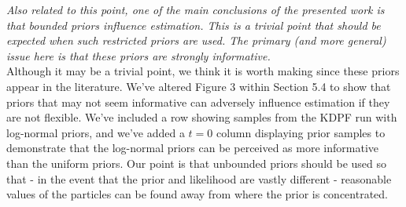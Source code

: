 \documentclass{article}
\newcommand{\danny}[1]{{\color{blue} DANNY: #1}}
\begin{document}



\noindent \emph{Also related to this point, one of the main conclusions of the presented work is that bounded priors influence estimation. This is a trivial point that should be expected when such restricted priors are used. The primary (and more general) issue here is that these priors are strongly informative.} \\

Although it may be a trivial point, we think it is worth making since these priors appear in the literature. We've altered Figure 3 within Section 5.4 to show that priors that may not seem informative can adversely influence estimation if they are not flexible. We've included a row showing samples from the KDPF run with log-normal priors, and we've added a $t = 0$ column displaying prior samples to demonstrate that the log-normal priors can be perceived as more informative than the uniform priors. Our point is that unbounded priors should be used so that - in the event that the prior and likelihood are vastly different - reasonable values of the particles can be found away from where the prior is concentrated.


\end{document}
